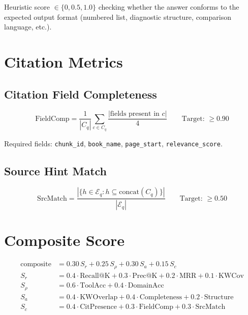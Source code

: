 \documentclass[12pt,a4paper]{report}
\begin{document}
Heuristic score $\in \{0, 0.5, 1.0\}$ checking whether the answer conforms to the expected output format (numbered list, diagnostic structure, comparison language, etc.).

\section{Citation Metrics}

\subsection{Citation Field Completeness}

\begin{equation}
  \text{FieldComp} = \frac{1}{|C_q|}\sum_{c\in C_q}\frac{|\text{fields present in }c|}{4} \qquad \text{Target: } \geq 0.90
\end{equation}

Required fields: \texttt{chunk\_id}, \texttt{book\_name}, \texttt{page\_start}, \texttt{relevance\_score}.

\subsection{Source Hint Match}

\begin{equation}
  \text{SrcMatch} = \frac{|\{h\in\mathcal{E}_q : h \subseteq \text{concat}(C_q)\}|}{|\mathcal{E}_q|} \qquad \text{Target: } \geq 0.50
\end{equation}

\section{Composite Score}

\begin{align}
  \text{composite} &= 0.30\,S_r + 0.25\,S_\rho + 0.30\,S_a + 0.15\,S_c \\[4pt]
  S_r &= 0.4\cdot\text{Recall@K} + 0.3\cdot\text{Prec@K} + 0.2\cdot\text{MRR} + 0.1\cdot\text{KWCov} \\
  S_\rho &= 0.6\cdot\text{ToolAcc} + 0.4\cdot\text{DomainAcc} \\
  S_a &= 0.4\cdot\text{KWOverlap} + 0.4\cdot\text{Completeness} + 0.2\cdot\text{Structure} \\
  S_c &= 0.4\cdot\text{CitPresence} + 0.3\cdot\text{FieldComp} + 0.3\cdot\text{SrcMatch}
\end{align}
\end{document}
